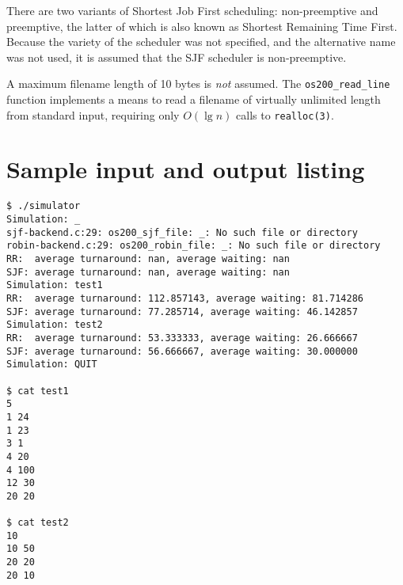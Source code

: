 \documentclass[a4paper,12pt,titlepage]{article}
\begin{document}
There are two variants of Shortest Job First scheduling: non-preemptive and
preemptive, the latter of which is also known as Shortest Remaining Time First.
Because the variety of the scheduler was not specified, and the alternative
name was not used, it is assumed that the SJF scheduler is non-preemptive.

A maximum filename length of 10 bytes is \textit{not} assumed. The
\texttt{os200\_read\_line} function implements a means to read a filename of
virtually unlimited length from standard input, requiring only $O(\lg n)$ calls
to \texttt{realloc(3)}.

\newpage

\section{Sample input and output listing}

\begin{lstlisting}
$ ./simulator
Simulation: _
sjf-backend.c:29: os200_sjf_file: _: No such file or directory
robin-backend.c:29: os200_robin_file: _: No such file or directory
RR:  average turnaround: nan, average waiting: nan
SJF: average turnaround: nan, average waiting: nan
Simulation: test1
RR:  average turnaround: 112.857143, average waiting: 81.714286
SJF: average turnaround: 77.285714, average waiting: 46.142857
Simulation: test2
RR:  average turnaround: 53.333333, average waiting: 26.666667
SJF: average turnaround: 56.666667, average waiting: 30.000000
Simulation: QUIT

$ cat test1
5
1 24
1 23
3 1
4 20
4 100
12 30
20 20

$ cat test2
10
10 50
20 20
20 10
\end{lstlisting}
\end{document}
